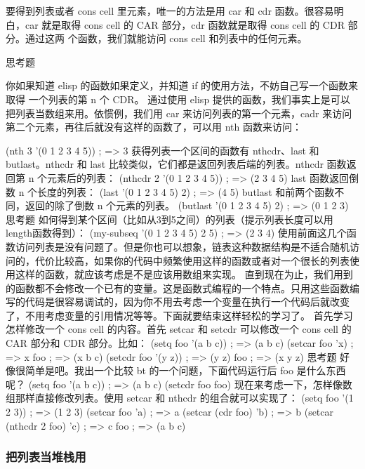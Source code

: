 \documentclass[11pt]{ctexart}
\begin{document}
要得到列表或者 cons cell 里元素，唯一的方法是用 car 和 cdr 函数。很容易明白，car
就是取得 cons cell 的 CAR 部分，cdr 函数就是取得 cons cell 的 CDR 部分。通过这两
个函数，我们就能访问 cons cell 和列表中的任何元素。

思考题

你如果知道 elisp 的函数如果定义，并知道 if 的使用方法，不妨自己写一个函数来取得
一个列表的第 n 个 CDR。
通过使用 elisp 提供的函数，我们事实上是可以把列表当数组来用。依惯例，我们用 car
来访问列表的第一个元素，cadr 来访问第二个元素，再往后就没有这样的函数了，可以用
nth 函数来访问：

(nth 3 '(0 1 2 3 4 5))                  ; => 3
获得列表一个区间的函数有 nthcdr、last 和 butlast。nthcdr 和 last 比较类似，它们都是返回列表后端的列表。nthcdr 函数返回第 n 个元素后的列表：
(nthcdr 2 '(0 1 2 3 4 5))               ; => (2 3 4 5)
last 函数返回倒数 n 个长度的列表：
(last '(0 1 2 3 4 5) 2)                 ; => (4 5)
butlast 和前两个函数不同，返回的除了倒数 n 个元素的列表。
(butlast '(0 1 2 3 4 5) 2)              ; => (0 1 2 3)
思考题
如何得到某个区间（比如从3到5之间）的列表（提示列表长度可以用 length函数得到）：
(my-subseq '(0 1 2 3 4 5) 2 5)          ; => (2 3 4)
使用前面这几个函数访问列表是没有问题了。但是你也可以想象，链表这种数据结构是不适合随机访问的，代价比较高，如果你的代码中频繁使用这样的函数或者对一个很长的列表使用这样的函数，就应该考虑是不是应该用数组来实现。
直到现在为止，我们用到的函数都不会修改一个已有的变量。这是函数式编程的一个特点。只用这些函数编写的代码是很容易调试的，因为你不用去考虑一个变量在执行一个代码后就改变了，不用考虑变量的引用情况等等。下面就要结束这样轻松的学习了。
首先学习怎样修改一个 cons cell 的内容。首先 setcar 和 setcdr 可以修改一个 cons cell 的 CAR 部分和 CDR 部分。比如：
(setq foo '(a b c))                     ; => (a b c)
(setcar foo 'x)                         ; => x
foo                                     ; => (x b c)
(setcdr foo '(y z))                     ; => (y z)
foo                                     ; => (x y z)
思考题
好像很简单是吧。我出一个比较 bt 的一个问题，下面代码运行后 foo 是什么东西呢？
(setq foo '(a b c))                     ; => (a b c)
(setcdr foo foo)
现在来考虑一下，怎样像数组那样直接修改列表。使用 setcar 和 nthcdr 的组合就可以实现了：
(setq foo '(1 2 3))                     ; => (1 2 3)
(setcar foo 'a)                         ; => a
(setcar (cdr foo) 'b)                   ; => b
(setcar (nthcdr 2 foo) 'c)              ; => c
foo                                     ; => (a b c)
\subsubsection{把列表当堆栈用}
\label{sec:orge3cc11c}
\end{document}
